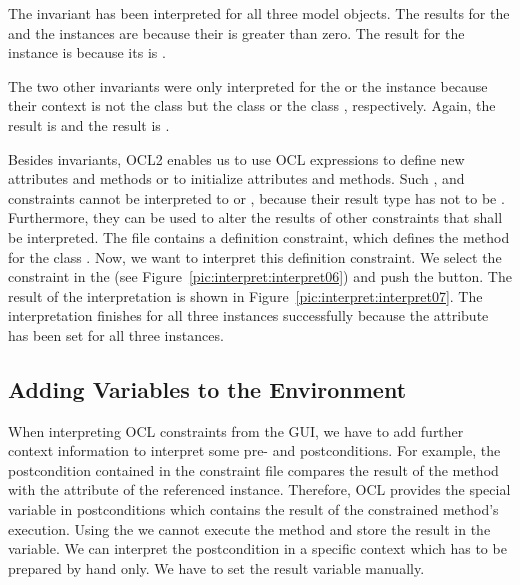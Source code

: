The invariant  has been interpreted for all three model objects. The results for the  and the  instances are  because their  is greater than zero. The result for the  instance is  because its  is .

The two other invariants were only interpreted for the  or the  instance because their context is not the class  but the class  or the class , respectively. Again, the  result is  and the  result is .

Besides invariants, \acs{OCL}2 enables us to use \acs{OCL} expressions to define new attributes and methods or to initialize attributes and methods. Such ,  and  constraints cannot be interpreted to  or , because their result type has not to be . Furthermore, they can be used to alter the results of other constraints that shall be interpreted. The  file contains a definition constraint, which defines the method  for the class .  Now, we want to interpret this definition constraint. We select the constraint in the  (see Figure~\ref{pic:interpret:interpret06}) and push the  button. The result of the interpretation is shown in Figure~\ref{pic:interpret:interpret07}. The interpretation finishes for all three instances successfully because the attribute  has been set for all three instances.



\subsection{Adding Variables to the Environment}

When interpreting OCL constraints from the GUI, we have to add further context information to interpret some pre- and postconditions. For example, the postcondition contained in the constraint file compares the result of the method  with the attribute  of the referenced  instance. Therefore, \acs{OCL} provides the special variable  in postconditions which contains the result of the constrained method's execution. Using the  we cannot execute the method  and store the result in the  variable. We can interpret the postcondition in a specific context which has to be prepared by hand only. We have to set the result variable manually.

